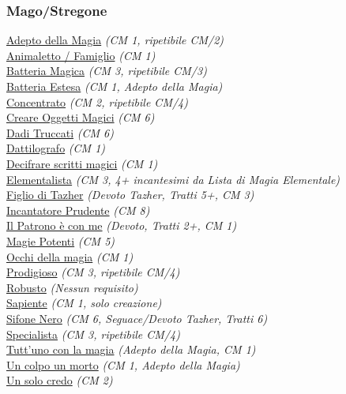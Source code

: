 \begin{multicols}{3}
{\begin{flushleft}
\titlespacing*{\subsubsection}{0pt}{0.5em}{0.5em}\subsubsection*{Mago/Stregone}

\hyperlink{Adepto della Magia}{Adepto della Magia} \textit{(CM 1, ripetibile CM/2)}\\
\hyperlink{Animaletto / Famiglio}{Animaletto / Famiglio} \textit{(CM 1)}\\
\hyperlink{Batteria Magica}{Batteria Magica} \textit{(CM 3, ripetibile CM/3)}\\
\hyperlink{Batteria Estesa}{Batteria Estesa} \textit{(CM 1, Adepto della Magia)}\\
\hyperlink{Concentrato}{Concentrato} \textit{(CM 2, ripetibile CM/4)}\\
\hyperlink{Creare Oggetti Magici}{Creare Oggetti Magici} \textit{(CM 6)}\\
\hyperlink{Dadi Truccati}{Dadi Truccati} \textit{(CM 6)}\\
\hyperlink{Dattilografo}{Dattilografo} \textit{(CM 1)}\\
\hyperlink{Decifrare scritti magici}{Decifrare scritti magici} \textit{(CM 1)}\\
\hyperlink{Elementalista}{Elementalista} \textit{(CM 3, 4+ incantesimi da Lista di Magia Elementale)}\\
\hyperlink{Figlio di Tazher}{Figlio di Tazher} \textit{(Devoto Tazher, Tratti 5+, CM 3)}\\
\hyperlink{Incantatore Prudente}{Incantatore Prudente} \textit{(CM 8)}\\
\hyperlink{Il Patrono è con me}{Il Patrono è con me} \textit{(Devoto, Tratti 2+, CM 1)}\\
\hyperlink{Magie Potenti}{Magie Potenti} \textit{(CM 5)}\\
\hyperlink{Occhi della magia}{Occhi della magia} \textit{(CM 1)}\\
\hyperlink{Prodigioso}{Prodigioso} \textit{(CM 3, ripetibile CM/4)}\\
\hyperlink{Robusto}{Robusto} \textit{(Nessun requisito)}\\
\hyperlink{Sapiente}{Sapiente} \textit{(CM 1, solo creazione)}\\
\hyperlink{Sifone Nero}{Sifone Nero} \textit{(CM 6, Seguace/Devoto Tazher, Tratti 6)}\\
\hyperlink{Specialista}{Specialista} \textit{(CM 3, ripetibile CM/4)}\\
\hyperlink{Tutt'uno con la magia}{Tutt'uno con la magia} \textit{(Adepto della Magia, CM 1)}\\
\hyperlink{Un colpo un morto}{Un colpo un morto} \textit{(CM 1, Adepto della Magia)}\\
\hyperlink{Un solo credo}{Un solo credo} \textit{(CM 2)}\\


\end{flushleft}}
\end{multicols}
